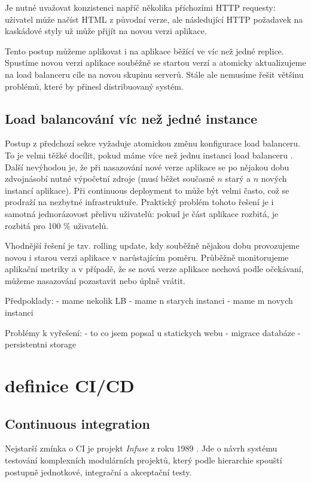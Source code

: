             Je nutné uvažovat konzistenci napříč několika příchozími HTTP requesty: uživatel může načíst HTML z původní verze, ale následující HTTP požadavek na kaskádové styly už může přijít na novou verzi aplikace.

            Tento postup můžeme aplikovat i na aplikace běžící ve víc než jedné replice. Spustíme novou verzi aplikace souběžně se startou verzí a atomicky aktualizujeme na load balanceru cíle na novou skupinu serverů. Stále ale nemusíme řešit většinu problémů, které by přinesl distribuovaný systém.

        \subsection{Load balancování víc než jedné instance}
            Postup z předchozí sekce vyžaduje atomickou změnu konfigurace load balanceru. To je velmi těžké docílit, pokud máme více než jednu instanci load balanceru . Další nevýhodou je, že při nasazování nové verze aplikace se po nějakou dobu zdvojnásobí nutné výpočetní zdroje (musí běžet současně $n$ starý a $n$ nových instancí aplikace). Při continuous deployment to může být velmi často, což se prodraží na nezbytné infrastruktuře. Praktický problém tohoto řešení je i samotná jednorázovost přelivu uživatelů: pokud je část aplikace rozbitá, je rozbitá pro 100 \% uživatelů.

            Vhodnější řešení je tzv. rolling update, kdy souběžně nějakou dobu provozujeme novou i starou verzi aplikace v narůstajícím poměru. Průběžně monitorujeme aplikační metriky a v případě, že se nová verze aplikace nechová podle očekávaní, můžeme nasazování pozastavit nebo úplně vrátit.


            Předpoklady:
                - mame nekolik LB
                - mame n starych instanci
                - mame m novych instanci

            Problémy k vyřešení:
                - to co jsem popsal u statickych webu
                - migrace databáze
                - persistentni storage


    \section{definice CI/CD}
        \subsection{Continuous integration}
            Nejstarší zmínka o CI je projekt \textit{Infuse} z roku 1989 \cite{kaiser-infuse}. Jde o návrh systému testování komplexních modulárních projektů, který podle hierarchie spouští postupně jednotkové, integrační a akceptační testy.

